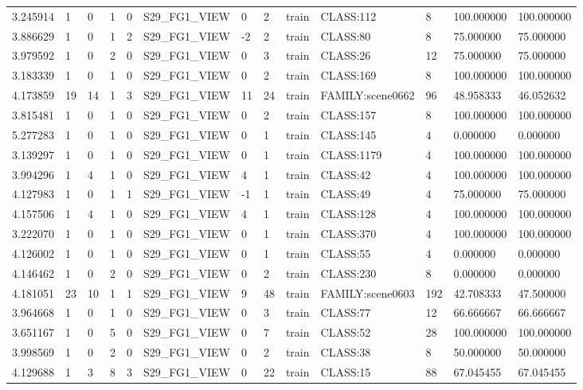 \begin{tabular}{lllllllllllll}
3.245914 & 1 & 0 & 1 & 0 & S29\_FG1\_VIEW & 0 & 2 & train & CLASS:112 & 8 & 100.000000 & 100.000000 \\
3.886629 & 1 & 0 & 1 & 2 & S29\_FG1\_VIEW & -2 & 2 & train & CLASS:80 & 8 & 75.000000 & 75.000000 \\
3.979592 & 1 & 0 & 2 & 0 & S29\_FG1\_VIEW & 0 & 3 & train & CLASS:26 & 12 & 75.000000 & 75.000000 \\
3.183339 & 1 & 0 & 1 & 0 & S29\_FG1\_VIEW & 0 & 2 & train & CLASS:169 & 8 & 100.000000 & 100.000000 \\
4.173859 & 19 & 14 & 1 & 3 & S29\_FG1\_VIEW & 11 & 24 & train & FAMILY:scene0662 & 96 & 48.958333 & 46.052632 \\
3.815481 & 1 & 0 & 1 & 0 & S29\_FG1\_VIEW & 0 & 2 & train & CLASS:157 & 8 & 100.000000 & 100.000000 \\
5.277283 & 1 & 0 & 1 & 0 & S29\_FG1\_VIEW & 0 & 1 & train & CLASS:145 & 4 & 0.000000 & 0.000000 \\
3.139297 & 1 & 0 & 1 & 0 & S29\_FG1\_VIEW & 0 & 1 & train & CLASS:1179 & 4 & 100.000000 & 100.000000 \\
3.994296 & 1 & 4 & 1 & 0 & S29\_FG1\_VIEW & 4 & 1 & train & CLASS:42 & 4 & 100.000000 & 100.000000 \\
4.127983 & 1 & 0 & 1 & 1 & S29\_FG1\_VIEW & -1 & 1 & train & CLASS:49 & 4 & 75.000000 & 75.000000 \\
4.157506 & 1 & 4 & 1 & 0 & S29\_FG1\_VIEW & 4 & 1 & train & CLASS:128 & 4 & 100.000000 & 100.000000 \\
3.222070 & 1 & 0 & 1 & 0 & S29\_FG1\_VIEW & 0 & 1 & train & CLASS:370 & 4 & 100.000000 & 100.000000 \\
4.126002 & 1 & 0 & 1 & 0 & S29\_FG1\_VIEW & 0 & 1 & train & CLASS:55 & 4 & 0.000000 & 0.000000 \\
4.146462 & 1 & 0 & 2 & 0 & S29\_FG1\_VIEW & 0 & 2 & train & CLASS:230 & 8 & 0.000000 & 0.000000 \\
4.181051 & 23 & 10 & 1 & 1 & S29\_FG1\_VIEW & 9 & 48 & train & FAMILY:scene0603 & 192 & 42.708333 & 47.500000 \\
3.964668 & 1 & 0 & 1 & 0 & S29\_FG1\_VIEW & 0 & 3 & train & CLASS:77 & 12 & 66.666667 & 66.666667 \\
3.651167 & 1 & 0 & 5 & 0 & S29\_FG1\_VIEW & 0 & 7 & train & CLASS:52 & 28 & 100.000000 & 100.000000 \\
3.998569 & 1 & 0 & 2 & 0 & S29\_FG1\_VIEW & 0 & 2 & train & CLASS:38 & 8 & 50.000000 & 50.000000 \\
4.129688 & 1 & 3 & 8 & 3 & S29\_FG1\_VIEW & 0 & 22 & train & CLASS:15 & 88 & 67.045455 & 67.045455 \\

\end{tabular}

